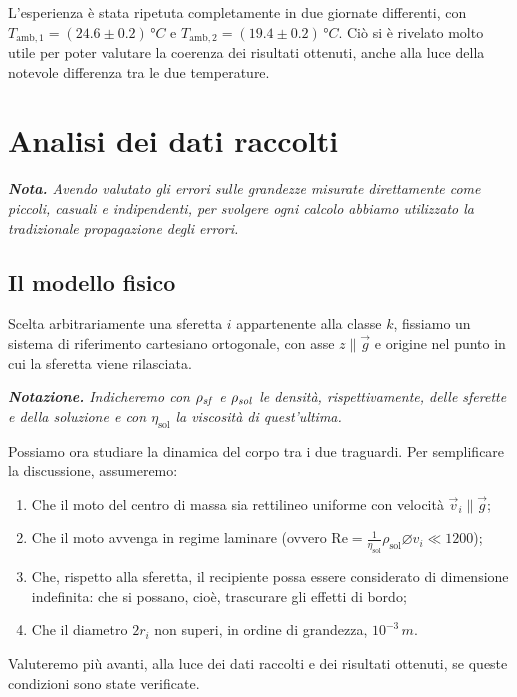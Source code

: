 \documentclass{article}
\newcommand*{\diam}{\varnothing}
\begin{document}
L'esperienza è stata ripetuta completamente in due giornate differenti,
con $T_{\text{amb},1} = (24.6\pm0.2)\,\unit{\degree C}$
e $T_{\text{amb},2} = (19.4\pm0.2)\,\unit{\degree C}$.
Ciò si è rivelato molto utile per poter valutare la
coerenza dei risultati ottenuti, anche alla luce della
notevole differenza tra le due temperature.


\section{Analisi dei dati raccolti}
\emph{\textbf{Nota.}
Avendo valutato gli errori sulle grandezze misurate direttamente
come piccoli, casuali e indipendenti, per svolgere ogni calcolo
abbiamo utilizzato la tradizionale propagazione degli errori.
}

\subsection{Il modello fisico}

Scelta arbitrariamente una sferetta $i$ appartenente alla classe $k$,
fissiamo un sistema di riferimento cartesiano ortogonale, con asse
$z\parallel\vec{g}$ e origine nel punto in cui la sferetta viene rilasciata.

\vspace{2mm}
\emph{
  \textbf{Notazione.} Indicheremo con $\rho_\text{\emph{sf}}$ e
  $\rho_\text{\emph{sol}}$ le densità, rispettivamente, delle sferette
  e della soluzione e con $\eta_\text{sol}$ la viscosità di quest'ultima.
}
\vspace{2mm}

Possiamo ora studiare la dinamica del corpo tra i due traguardi.
Per semplificare la discussione, assumeremo:
\begin{enumerate}
  \item Che il moto del centro di massa sia rettilineo uniforme con velocità
    $\vec{v}_i\parallel\vec{g}$;
  \item Che il moto avvenga in regime laminare
    (ovvero $\text{Re}=\frac{1}{\eta_\text{sol}}\rho_\text{sol}\diam v_i \ll 1200$);
  \item Che, rispetto alla sferetta, il recipiente possa essere
    considerato di dimensione indefinita: che si possano, cioè,
    trascurare gli effetti di bordo;
  \item Che il diametro $2r_i$ non superi, in ordine di grandezza,
    $10^{-3}\,\unit{m}$.
\end{enumerate}
Valuteremo più avanti, alla luce dei dati raccolti e dei risultati ottenuti,
se queste condizioni sono state verificate.
\end{document}
